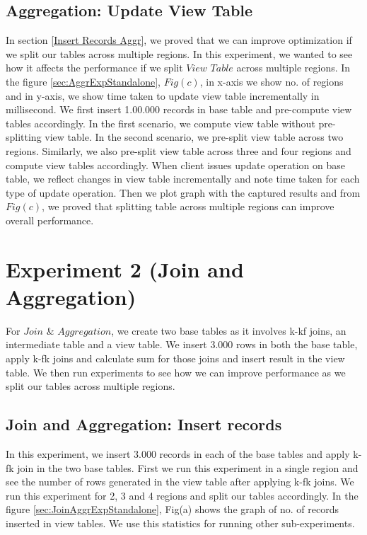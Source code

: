 \documentclass[11pt,a4paper,bibtotoc,idxtotoc,headsepline,footsepline,footexclude,BCOR12mm,DIV13]{scrbook}
\begin{document}
\subsection{Aggregation: Update View Table} 
\label{Update View Table Aggr}
In section \ref{Insert Records Aggr}, we proved that we can improve optimization if we split our tables across multiple regions. In this experiment, we wanted to see how it affects the performance if we split $View$ $Table$ across multiple regions. In the figure \ref{sec:AggrExpStandalone}, $Fig(c)$, in x-axis we show no. of regions and in y-axis, we show time taken to update view table incrementally in millisecond. We first insert 1.00.000 records in base table and pre-compute view tables accordingly. In the first scenario, we compute view table without pre-splitting view table. In the second scenario, we pre-split view table across two regions. Similarly, we also pre-split view table across three and four regions and compute view tables accordingly. When client issues update operation on base table, we reflect changes in view table incrementally and note time taken for each type of update operation. Then we plot graph with the captured results and from $Fig(c)$, we proved that splitting table across multiple regions can improve overall performance. 

\section{Experiment 2 (Join and Aggregation)}
\label{(sec:Join and Aggregation Exp)} 
For $Join$ \& $Aggregation$, we create two base tables as it involves k-kf joins, an intermediate table and a view table. We insert 3.000 rows in both the base table, apply k-fk joins and calculate sum for those joins and insert result in the view table. We then run experiments to see how we can improve performance as we split our tables across multiple regions.

\subsection{Join and Aggregation: Insert records}
\label{Join and Aggregation: Insert records Standalone}
In this experiment, we insert 3.000 records in each of the base tables and apply k-fk join in the two base tables. First we run this experiment in a single region and see the number of rows generated in the view table after applying k-fk joins. We run this experiment for 2, 3 and 4 regions and split our tables accordingly. In the figure \ref{sec:JoinAggrExpStandalone}, Fig(a) shows the graph of no. of records inserted in view tables. We use this statistics for running other sub-experiments.
\end{document}
